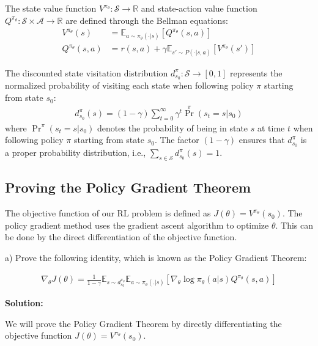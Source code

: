 The state value function $V^{\pi_\theta}: \mathcal{S} \rightarrow \mathbb{R}$ and state-action value function $Q^{\pi_\theta}: \mathcal{S} \times \mathcal{A} \rightarrow \mathbb{R}$ are defined through the Bellman equations:
\begin{align}
    V^{\pi_\theta}(s) &= \mathbb{E}_{a\sim \pi_\theta(\cdot|s)} [Q^{\pi_\theta}(s,a)] \label{eq:value_function}\\
    Q^{\pi_\theta}(s,a) &= r(s, a) + \gamma\mathbb{E}_{s'\sim P(\cdot|s, a)} [V^{\pi_\theta}(s')] \label{eq:q_function}
\end{align}

The discounted state visitation distribution $d^{\pi}_{s_0}: \mathcal{S} \rightarrow [0, 1]$ represents the normalized probability of visiting each state when following policy $\pi$ starting from state $s_0$:
\begin{align}
    d^{\pi}_{s_0}(s) = (1-\gamma)\sum_{t = 0}^{\infty}\gamma^t \Pr^{\pi}(s_t = s|s_0) \label{eq:state_visitation}
\end{align}
where $\Pr^{\pi}(s_t = s|s_0)$ denotes the probability of being in state $s$ at time $t$ when following policy $\pi$ starting from state $s_0$. The factor $(1-\gamma)$ ensures that $d^{\pi}_{s_0}$ is a proper probability distribution, i.e., $\sum_{s \in \mathcal{S}} d^{\pi}_{s_0}(s) = 1$.

\subsection{Proving the Policy Gradient Theorem}

The objective function of our RL problem is defined as $J(\theta) = V^{\pi_\theta}(s_0)$. The policy gradient method uses the gradient ascent algorithm to optimize $\theta$. This can be done by the direct differentiation of the objective function.

a) Prove the following identity, which is known as the Policy Gradient Theorem:

\begin{align}\label{policy_grad}
    \nabla_\theta J(\theta) = \frac{1}{1-\gamma}\mathbb{E}_{s \sim d^{\pi_\theta}_{s_0}}\mathbb{E}_{a \sim \pi_\theta(.|s)} [\nabla_\theta \log \pi_\theta (a|s) Q^{\pi_\theta} (s, a)]
\end{align}

\textbf{Solution:}

We will prove the Policy Gradient Theorem by directly differentiating the objective function $J(\theta) = V^{\pi_\theta}(s_0)$.

